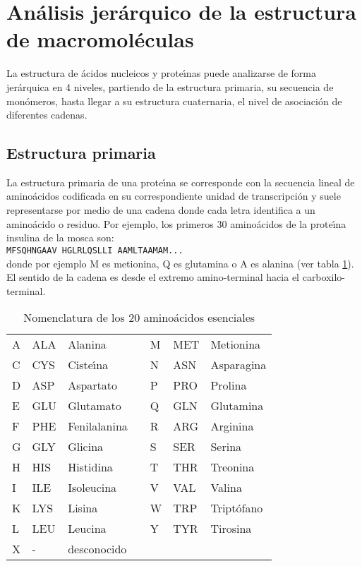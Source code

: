 \section{An\'{a}lisis jer\'{a}rquico de la estructura de macromol\'{e}culas}

La estructura de \'{a}cidos nucleicos y prote\'\i{}nas puede analizarse de forma jer\'{a}rquica en 4 niveles, partiendo de
la estructura primaria, su secuencia de mon\'{o}meros, hasta llegar a su estructura cuaternaria, el nivel de asociaci\'{o}n
de diferentes cadenas. 

\subsection{Estructura primaria} 

La estructura primaria de una prote\'\i{}na se corresponde con la secuencia lineal de amino\'{a}cidos codificada
en su correspondiente unidad de transcripci\'{o}n y suele representarse por medio de una cadena donde cada 
letra identifica a un amino\'{a}cido o residuo. Por ejemplo, los primeros 30 amino\'{a}cidos de la prote\'\i{}na 
insulina de la mosca  son:\\ 

\texttt{MFSQHNGAAV HGLRLQSLLI AAMLTAAMAM...}\\

donde por ejemplo M es metionina, Q es glutamina o A es alanina (ver tabla \ref{tab:amino}). El sentido de la cadena 
es desde el extremo amino-terminal hacia el carboxilo-terminal. 

\begin{table}[h]
\begin{center}
\begin{scriptsize}
\begin{tabular}{|l|l|l|l|l|l|l|}\hline
A & ALA & Alanina & & M & MET & Metionina\\   
C & CYS & Ciste\'\i{}na & & N & ASN & Asparagina\\
D & ASP & Aspartato & & P & PRO & Prolina\\ 
E & GLU & Glutamato & & Q & GLN & Glutamina\\  
F & PHE & Fenilalanina & & R & ARG & Arginina\\
G & GLY & Glicina & & S & SER & Serina\\      
H & HIS & Histidina & & T & THR & Treonina\\    
I & ILE & Isoleucina & & V & VAL & Valina\\   
K & LYS & Lisina & & W & TRP & Tript\'{o}fano\\
L & LEU & Leucina & & Y & TYR & Tirosina\\
X & -   & desconocido & & & &\\\hline
\end{tabular}
\end{scriptsize}
\end{center}
\caption%
{Nomenclatura de los 20 amino\'{a}cidos esenciales}
\label{tab:amino}
\end{table}

